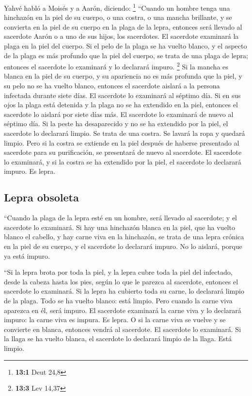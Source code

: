 \begin{paracol}{2}
 Yahvé habló a Moisés y a Aarón, diciendo: \footnote{\textbf{13:1}
  Deut 24,8}  ``Cuando un hombre tenga una hinchazón en la
piel de su cuerpo, o una costra, o una mancha brillante, y se convierta
en la piel de su cuerpo en la plaga de la lepra, entonces será llevado
al sacerdote Aarón o a uno de sus hijos, los sacerdotes. 
El sacerdote examinará la plaga en la piel del cuerpo. Si el pelo de la
plaga se ha vuelto blanco, y el aspecto de la plaga es más profundo que
la piel del cuerpo, se trata de una plaga de lepra; entonces el
sacerdote lo examinará y lo declarará impuro. \footnote{\textbf{13:3}
  Lev 14,37}  Si la mancha es blanca en la piel de su
cuerpo, y su apariencia no es más profunda que la piel, y su pelo no se
ha vuelto blanco, entonces el sacerdote aislará a la persona infectada
durante siete días.  El sacerdote lo examinará al séptimo
día. Si en sus ojos la plaga está detenida y la plaga no se ha extendido
en la piel, entonces el sacerdote lo aislará por siete días más.
 El sacerdote lo examinará de nuevo al séptimo día. Si la
peste ha desaparecido y no se ha extendido por la piel, el sacerdote lo
declarará limpio. Se trata de una costra. Se lavará la ropa y quedará
limpio.  Pero si la costra se extiende en la piel después
de haberse presentado al sacerdote para su purificación, se presentará
de nuevo al sacerdote.  El sacerdote lo examinará, y si la
costra se ha extendido por la piel, el sacerdote lo declarará impuro. Es
lepra.

\hypertarget{lepra-obsoleta}{%
\subsection{Lepra obsoleta}\label{lepra-obsoleta}}

 ``Cuando la plaga de la lepra esté en un hombre, será
llevado al sacerdote;  y el sacerdote lo examinará. Si
hay una hinchazón blanca en la piel, que ha vuelto blanco el cabello, y
hay carne viva en la hinchazón,  se trata de una lepra
crónica en la piel de su cuerpo, y el sacerdote lo declarará impuro. No
lo aislará, porque ya está impuro.

 ``Si la lepra brota por toda la piel, y la lepra cubre
toda la piel del infectado, desde la cabeza hasta los pies, según lo que
le parezca al sacerdote,  entonces el sacerdote lo
examinará. Si la lepra ha cubierto toda su carne, lo declarará limpio de
la plaga. Todo se ha vuelto blanco: está limpio.  Pero
cuando la carne viva aparezca en él, será impuro.  El
sacerdote examinará la carne viva y lo declarará impuro: la carne viva
es impura. Es lepra.  O si la carne viva se vuelve y se
convierte en blanca, entonces vendrá al sacerdote.  El
sacerdote lo examinará. Si la llaga se ha vuelto blanca, el sacerdote lo
declarará limpio de la llaga. Está limpio.


\end{paracol}
